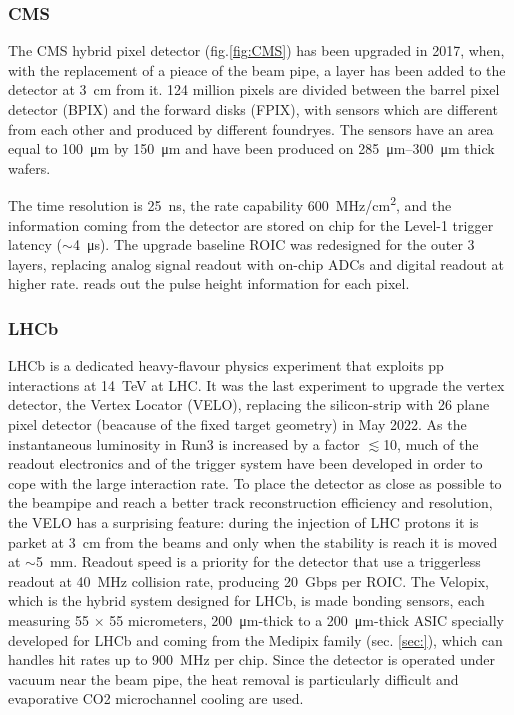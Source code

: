         \subsubsection{CMS}
        The CMS hybrid pixel detector (fig.\ref{fig:CMS}) has been upgraded in 2017, when, with the replacement of a pieace of the beam pipe, a layer has been added to the detector at \SI{3}{cm} from it.
        124 million pixels are divided between the barrel pixel detector (BPIX) and the forward disks (FPIX), with sensors which are different from each other and produced by different foundryes. 
        The sensors have an area equal to \SI{100}{\um} by \SI{150}{\um} and have been produced on \SIrange{285}{300}{\um} thick wafers.
    
        The time resolution is \SI{25}{ns}, the rate capability  \SI{600}{MHz/cm\squared}, and the information coming from the detector are stored on chip for the Level-1 trigger latency ($\sim$\SI{4}{\us}).   
        The upgrade baseline ROIC was redesigned for the outer 3 layers, replacing analog signal readout with on-chip ADCs and digital readout at higher rate. reads out the pulse height information for each pixel. 

        \subsubsection{LHCb}
        LHCb is a dedicated heavy-flavour physics experiment that exploits pp interactions at \SI{14}{TeV} at LHC. 
        It was the last experiment to upgrade the vertex detector, the Vertex Locator (VELO), replacing the silicon-strip with 26 plane pixel detector (beacause of the fixed target geometry) in May 2022. 
        As the instantaneous luminosity in Run3 is increased by a factor $\lesssim$10, much of the readout electronics and of the trigger system have been developed in order to cope with the large interaction rate.
        To place the detector as close as possible to the beampipe and reach a better track reconstruction efficiency and resolution, the VELO has a surprising feature: during the injection of LHC protons it is parket at \SI{3}{cm} from the beams and only when the stability is reach it is moved at $\sim$\SI{5}{mm}. Readout speed is a priority for the detector that use a triggerless readout at \SI{40}{MHz} collision rate, producing \SI{20}{Gbps} per ROIC. 
        The Velopix, which is the hybrid system designed for LHCb, is made bonding sensors, each measuring 55 $\times$ 55 micrometers, \SI{200}{\um}-thick to a \SI{200}{\um}-thick ASIC specially developed for LHCb and coming from the Medipix family (sec. \ref{sec:}), which can handles hit rates up to \SI{900}{MHz} per chip. 
        Since the detector is operated under vacuum near the beam pipe, the heat removal is particularly difficult and evaporative CO2 microchannel cooling are used. 

